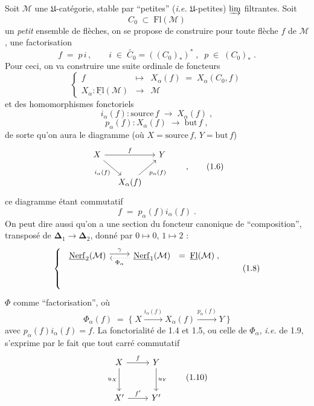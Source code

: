 \documentclass[11pt]{article}
\newcommand{\printedpage}[1]{\marginpar{\footnotesize p.~#1}}
\newcommand{\msp}[1]{\marginpar{\footnotesize [#1]}}
\newcommand{\M}{\mathcal{M}}
\newcommand{\Fl}{\mathrm{Fl}}
\newcommand{\uFl}{\underline{\mathrm{Fl}}}
\newcommand{\uNerf}{\underline{\mathrm{Nerf}}}
\begin{document}
Soit $\M$ une $\mathfrak{U}$-catégorie, stable par “petites” (\textit{i.e.} $\mathfrak{U}$-petites) $\varinjlim$ filtrantes. Soit
\[
C_0 \;\subset\; \Fl(\M)
\tag*{(1.1)}
\]
un \textit{petit} ensemble de flèches, on se propose de construire pour toute flèche $f$ de $\M$, une factorisation
\[
f \;=\; p\,i \,, \qquad i \;\in\; \widetilde{C_0} = ((C_0)_*)^* \;, \;\; p \;\in\; (C_0)_* \;.
\tag*{(1.2)}
\]
Pour ceci, on va construire une suite ordinale de foncteurs
\[
\left\{
\begin{array}{rcl}
f & \longmapsto & X_\alpha(f) \;=\; X_\alpha(C_0,f) \\
X_\alpha : \uFl(\M) & \longrightarrow & \M
\end{array}
\right.
\tag*{(1.3)}
\]
et des homomorphismes fonctoriels
\[
i_\alpha(f) : \mathrm{source}\, f \;\longrightarrow\; X_\alpha(f) \;,
\tag*{(1.4)}
\]
\[
p_\alpha(f) : X_\alpha(f) \;\longrightarrow\; \mathrm{but}\, f \;,
\tag*{(1.5)}
\]
de sorte qu'on aura le diagramme (où $X = \mathrm{source}\, f$, $Y = \mathrm{but}\, f$)
\[
\begin{tikzcd}[column sep=small]
X \arrow[rr, "f"] \arrow[dr, "i_\alpha(f)"'] & & Y \\
& X_\alpha(f) \arrow[ur, "p_\alpha(f)"'] &
\end{tikzcd}
\qquad ,
\tag*{(1.6)}
\]
ce diagramme étant commutatif
\[
f \;=\; p_\alpha(f) i_\alpha(f) \;.
\tag*{(1.7)}
\]
On peut dire aussi qu'on a une section du foncteur canonique de “composition”, transposé de $\boldsymbol{\Delta}_1 \longrightarrow \boldsymbol{\Delta}_2$, donné par $0 \longmapsto 0$, $1 \longmapsto 2$ :
\[
\left\{
\begin{array}{l}
\begin{tikzcd}[ampersand replacement=\&]
\uNerf_2(\M) \arrow[r, shift left, "\gamma"] \& \uNerf_1(\M) \arrow[l, dotted, shift left, "\Phi_\alpha"]
\end{tikzcd}
\;=\; \uFl(\M) \;, \\[1ex]
\\[1ex]
\\
\end{array}
\right.
\tag*{(1.8)}
\]
$\Phi$ comme “factorisation”,
\printedpage{2}
\msp{page 2}
où
\[
\Phi_\alpha(f) \;=\; \{\; X \xrightarrow{i_\alpha(f)} X_\alpha(f) \xrightarrow{p_\alpha(f)} Y \;\}
\tag*{(1.9)}
\]
avec $p_\alpha(f)i_\alpha(f) = f$. La fonctorialité de 1.4 et 1.5, ou celle de $\Phi_\alpha$, \textit{i.e.} de 1.9, s'exprime par le fait que tout carré commutatif
\[
\begin{tikzcd}[row sep=large]
X \arrow[r, "f"] \arrow[d, "u_X"'] & Y \arrow[d, "u_Y"] \\
X' \arrow[r, "{f'}"] & Y'
\end{tikzcd}
\tag*{(1.10)}
\]
\end{document}
